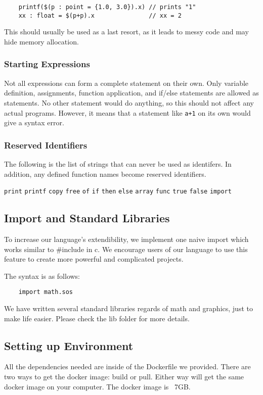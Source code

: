 \documentclass[main.tex]{subfiles}
\begin{document}
	\begin{lstlisting}
	printf($(p : point = {1.0, 3.0}).x) // prints "1"
	xx : float = $(p+p).x               // xx = 2 \end{lstlisting}
	
	This should usually be used as a last resort, as it leads to messy code and may hide memory allocation.
	
	\subsubsection{Starting Expressions}
	Not all expressions can form a complete statement on their own. Only variable definition, assignments, function application, and if/else statements are allowed as statements. No other statement would do anything, so this should not affect any actual programs. However, it means that a statement like \texttt{a+1} on its own would give a syntax error.
	
	\subsubsection{Reserved Identifiers}
	The following is the list of strings that can never be used as identifers. In addition, any defined function names become reserved identifiers.
	
	\texttt{print}  \texttt{printf}  \texttt{copy}  \texttt{free}  \texttt{of}  \texttt{if} \texttt{then}  \texttt{else}  \texttt{array}  \texttt{func}  \texttt{true}  \texttt{false}  \texttt{import}

	\subsection{Import and Standard Libraries}
	To increase our language’s extendibility, we implement one naive import which works similar to #include in c. We encourage users of our language to use this feature to create more powerful and complicated projects.

	The syntax is as follows:

	\begin{lstlisting}
    import math.sos
	\end{lstlisting}

	We have written several standard libraries regards of math and graphics, just to make life easier. Please check the lib folder for more details.
	
	\subsection{Setting up Environment}
	All the dependencies needed are inside of the Dockerfile we provided. There are two ways to get the docker image: build or pull. Either way will get the same docker image on your computer. The docker image is ~7GB.
\end{document}
